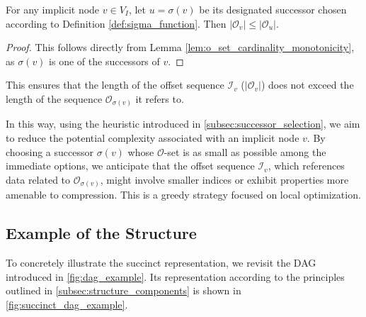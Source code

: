 \begin{proposition}
    For any implicit node $v \in V_I$, let $u = \sigma(v)$ be its designated successor chosen according to Definition \ref{def:sigma_function}. Then $|\mathcal{O}_v| \le |\mathcal{O}_u|$.
\end{proposition}
\begin{proof}
    This follows directly from Lemma \ref{lem:o_set_cardinality_monotonicity}, as $\sigma(v)$ is one of the successors of $v$.
\end{proof}
This ensures that the length of the offset sequence $\mathcal{I}_v$ ($|\mathcal{O}_v|$) does not exceed the length of the sequence $\mathcal{O}_{\sigma(v)}$ it refers to.

In this way, using the heuristic introduced in \ref{subsec:successor_selection}, we aim to reduce the potential complexity associated with an implicit node $v$. By choosing a successor $\sigma(v)$ whose $\mathcal{O}$-set is as small as possible among the immediate options, we anticipate that the offset sequence $\mathcal{I}_v$, which references data related to $\mathcal{O}_{\sigma(v)}$, might involve smaller indices or exhibit properties more amenable to compression. This is a greedy strategy focused on local optimization.

\subsection*{Example of the Structure}
\label{subsec:structure_example}

To concretely illustrate the succinct representation, we revisit the DAG introduced in \autoref{fig:dag_example}. Its representation according to the principles outlined in \autoref{subsec:structure_components} is shown in \autoref{fig:succinct_dag_example}.

